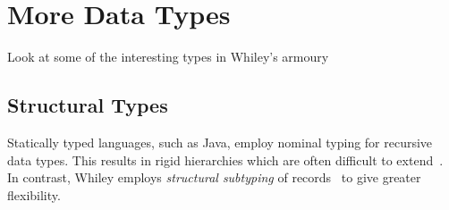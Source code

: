 \section{More Data Types}
Look at some of the interesting types in Whiley's armoury


%
%
%
%

\subsection{Structural Types}
Statically typed languages, such as Java, employ nominal typing for
recursive data types.  This results in rigid hierarchies which are
often difficult to extend~\cite{MA08}.  In contrast, Whiley employs
{\em structural subtyping} of records~\cite{Card88} to give greater
flexibility.

